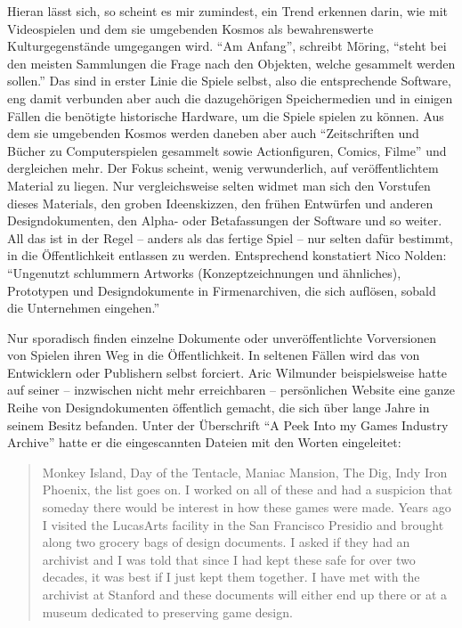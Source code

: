\documentclass[a5paper,pagesize]{scrbook}
\begin{document}
Hieran lässt sich, so scheint es mir zumindest, ein Trend erkennen darin, wie mit Videospielen und dem sie umgebenden Kosmos als bewahrenswerte Kulturgegenstände umgegangen wird.
\enquote{Am Anfang}, schreibt Möring, \enquote{steht bei den meisten Sammlungen die Frage nach den Objekten, welche gesammelt werden sollen.}\autocite[S.~121]{moering_kulturarchive_2020}
Das sind in erster Linie die Spiele selbst, also die entsprechende Software, eng damit verbunden aber auch die dazugehörigen Speichermedien und in einigen Fällen die benötigte historische Hardware, um die Spiele spielen zu können.
Aus dem sie umgebenden Kosmos werden daneben aber auch \enquote{Zeitschriften und Bücher zu Computerspielen gesammelt sowie Actionfiguren, Comics, Filme}\autocite[S.~121]{moering_kulturarchive_2020} und dergleichen mehr.
Der Fokus scheint, wenig verwunderlich, auf veröffentlichtem Material zu liegen.
Nur vergleichsweise selten widmet man sich den Vorstufen dieses Materials, den groben Ideenskizzen, den frühen Entwürfen und anderen Designdokumenten, den Alpha- oder Betafassungen der Software und so weiter.
All das ist in der Regel -- anders als das fertige Spiel -- nur selten dafür bestimmt, in die Öffentlichkeit entlassen zu werden.
Entsprechend konstatiert Nico Nolden:
\enquote{Ungenutzt schlummern Artworks (Konzeptzeichnungen
und ähnliches), Prototypen und Designdokumente in Firmenarchiven, die sich auf‌lösen, sobald die Unternehmen eingehen.}

Nur sporadisch finden einzelne Dokumente oder unveröffentlichte Vorversionen von Spielen ihren Weg in die Öffentlichkeit.
In seltenen Fällen wird das von Entwicklern oder Publishern selbst forciert.
Aric Wilmunder beispielsweise hatte auf seiner -- inzwischen nicht mehr erreichbaren -- persönlichen Website eine ganze Reihe von Designdokumenten öffentlich gemacht, die sich über lange Jahre in seinem Besitz befanden.
Unter der Überschrift \enquote{A Peek Into my Games Industry Archive} hatte er die eingescannten Dateien mit den Worten eingeleitet:

\begin{quote}
Monkey Island, Day of the Tentacle, Maniac Mansion, The Dig, Indy Iron Phoenix, the list goes on.
I worked on all of these and had a suspicion that someday there would be interest in how these games were made.
Years ago I visited the LucasArts facility in the San Francisco Presidio and brought along two grocery bags of design documents.
I asked if they had an archivist and I was told that since I had kept these safe for over two decades, it was best if I just kept them together.
I have met with the archivist at Stanford and these documents will either end up there or at a museum dedicated to preserving game design.\autocite{wilmunder_peek}
\end{quote}
\end{document}
